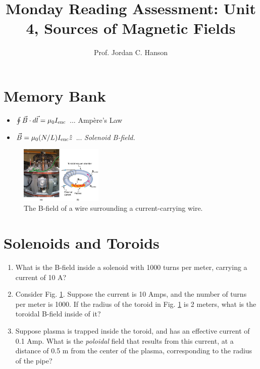 \documentclass{article}
\begin{document}
\title{Monday Reading Assessment: Unit 4, Sources of Magnetic Fields}
\author{Prof. Jordan C. Hanson}

\maketitle

\section{Memory Bank}

\begin{itemize}
\item $\oint \vec{B} \cdot d\vec{l} = \mu_0 I_{\rm enc}$ ... Amp\`{e}re's Law
\item $\vec{B} = \mu_0 (N/L) I_{\rm enc} \hat{z}$ ... \textit{Solenoid B-field.}
\end{itemize}

\begin{figure}[ht]
\centering
\includegraphics[width=0.35\textwidth,trim=8.5cm 1cm 0cm 3cm,clip=true]{toroid.jpeg}
\caption{\label{fig:fields} The B-field of a wire surrounding a current-carrying wire.}
\end{figure}

\section{Solenoids and Toroids}

\begin{enumerate}
\item What is the B-field inside a solenoid with 1000 turns per meter, carrying a current of 10 A? \\ \vspace{1cm}
\item Consider Fig. \ref{fig:fields}.  Suppose the current is 10 Amps, and the number of turns per meter is 1000.  If the radius of the toroid in Fig. \ref{fig:fields} is 2 meters, what is the toroidal B-field inside of it? \\ \vspace{2cm}
\item Suppose plasma is trapped inside the toroid, and has an effective current of 0.1 Amp.  What is the \textit{poloidal} field that results from this current, at a distance of 0.5 m from the center of the plasma, corresponding to the radius of the pipe?
\end{enumerate}
\end{document}
